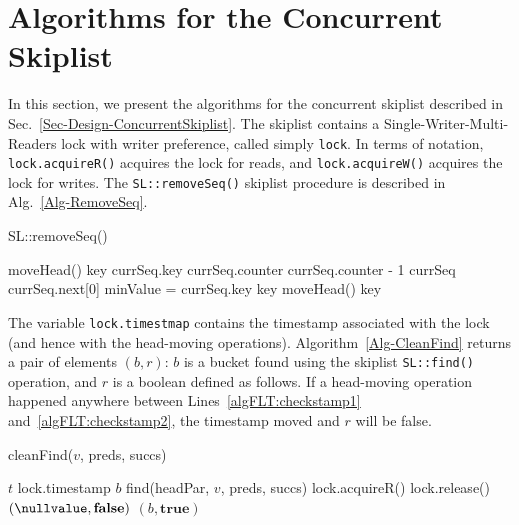 \section{Algorithms for the Concurrent Skiplist}
\label{App-Algorithms-ConcurrentSkiplist}

In this section, we present the algorithms for the concurrent skiplist described in Sec.~\ref{Sec-Design-ConcurrentSkiplist}. The skiplist contains a Single-Writer-Multi-Readers lock with writer preference, called simply \texttt{lock}. In terms of notation, \texttt{lock.acquireR()} acquires the lock for reads, and \texttt{lock.acquireW()} acquires the lock for writes. The \texttt{SL::removeSeq()} skiplist procedure is described in Alg.~\ref{Alg-RemoveSeq}.

\begin{algorithm}[!htb]
\caption{SL::removeSeq()}
\label{Alg-RemoveSeq}
\begin{algorithmic}[1]
	\State \Return \maxInt
\EndIf
{}
	\State moveHead()
\EndIf
\State key \attr currSeq.key
\State currSeq.counter \attr currSeq.counter - 1
		\State currSeq \attr currSeq.next[0]
			\State minValue = currSeq.key
			\State \Return key
		\EndIf
	\EndWhile
	\State moveHead()
\EndIf
\State \Return key
\end{algorithmic}
\end{algorithm}

The variable \texttt{lock.timestmap} contains the timestamp associated with the lock (and hence with the head-moving operations). Algorithm~\ref{Alg-CleanFind} returns a pair of elements $(b,r)$: $b$ is a bucket found using the skiplist \texttt{SL::find()} operation, and $r$ is a boolean defined as follows. If a head-moving operation happened anywhere between Lines~\ref{algFLT:checkstamp1} and~\ref{algFLT:checkstamp2}, the timestamp moved and $r$ will be false.

\begin{algorithm}[!htb]
\caption{cleanFind($v$, preds, succs)}
\label{Alg-CleanFind}
\begin{algorithmic}[1]
\State $t$ \attr lock.timestamp \label{algFLT:checkstamp1}
\State $b$ \attr find(headPar, $v$, preds, succs)
\State lock.acquireR()
 \label{algFLT:checkstamp2}
	\State lock.release()
	\State \Return $(\nullvalue, \mathbf{false})$
\EndIf
\State \Return $(b, \mathbf{true})$
\end{algorithmic}
\end{algorithm}

